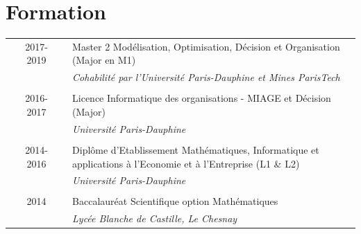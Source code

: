 \documentclass[a4paper,10pt]{article}
\begin{document}
\section{Formation}
\begin{tabular}{p{0.06cm} c p{0.04cm}|p{12.5cm}}
 & \textsc{2017-2019} & & Master 2 Modélisation, Optimisation, Décision et Organisation (Major en M1)\\&&&\emph{\small{Cohabilité par l'Université Paris-Dauphine et Mines ParisTech}}\\\multicolumn{2}{c}{} \\
 & \textsc{2016-2017} & & Licence Informatique des organisations - MIAGE et Décision (Major)\\&&&\emph{\small{Université Paris-Dauphine}}\\\multicolumn{2}{c}{} \\
 & \textsc{2014-2016} & & Diplôme d'Etablissement Mathématiques, Informatique et applications à l'Economie et à l'Entreprise (L1 \& L2) \\&&&\emph{\small{Université Paris-Dauphine}}\\\multicolumn{2}{c}{} \\
 &\textsc{2014} & & Baccalauréat Scientifique option Mathématiques \\&&&\emph{\small{Lycée Blanche de Castille, Le Chesnay}}\\
\end{tabular}
\titlespacing{\section}{0pt}{2pt}{2pt}
\end{document}
